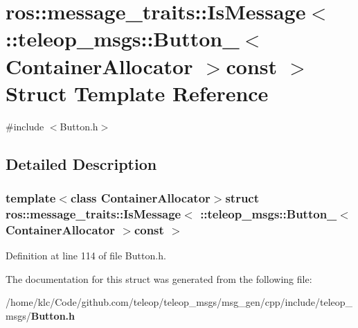 \section{ros::message\_\-traits::IsMessage$<$ ::teleop\_\-msgs::Button\_\-$<$ ContainerAllocator $>$const $>$ Struct Template Reference}
\label{structros_1_1message__traits_1_1IsMessage_3_01_1_1teleop__msgs_1_1Button___3_01ContainerAllocator_01_4const_01_01_4}


{\ttfamily \#include $<$Button.h$>$}



\subsection{Detailed Description}
\subsubsection*{template$<$class ContainerAllocator$>$struct ros::message\_\-traits::IsMessage$<$ ::teleop\_\-msgs::Button\_\-$<$ ContainerAllocator $>$const  $>$}



Definition at line 114 of file Button.h.



The documentation for this struct was generated from the following file:\begin{DoxyCompactItemize}
\item 
/home/klc/Code/github.com/teleop/teleop\_\-msgs/msg\_\-gen/cpp/include/teleop\_\-msgs/{\bf Button.h}\end{DoxyCompactItemize}
